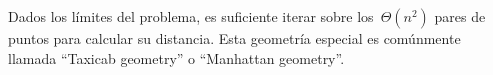 
Dados los límites del problema, es suficiente iterar sobre los~$\Theta(n^2)$ pares de
puntos para calcular su distancia. Esta geometría especial es comúnmente llamada
``Taxicab geometry'' o ``Manhattan geometry''.

